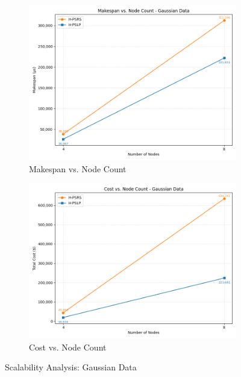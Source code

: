 \documentclass[]{interact}
\theoremstyle{plain}
\theoremstyle{definition}
\theoremstyle{remark}
\begin{document}
\begin{figure}[H]
    \centering
    \begin{subfigure}{0.48\textwidth}
        \includegraphics[width=\textwidth]{src/out_matplotlib_charts/scale_makespan_gaussian_nodes.png}
        \caption{Makespan vs. Node Count}
        \label{fig:m8}
    \end{subfigure}
    \hfill
    \begin{subfigure}{0.48\textwidth}
        \includegraphics[width=\textwidth]{src/out_matplotlib_charts/scale_cost_gaussian_nodes.png}
        \caption{Cost vs. Node Count}
        \label{fig:m9}
    \end{subfigure}
    \caption{Scalability Analysis: Gaussian Data}
    \label{fig:scale_gaussian}
\end{figure}
\end{document}
